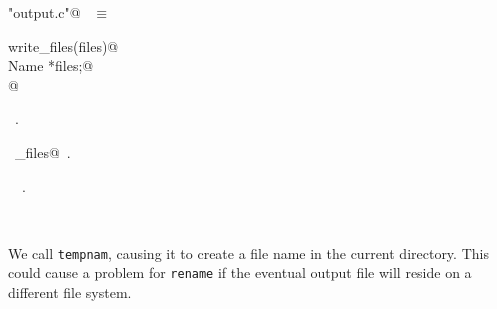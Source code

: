 \documentclass{report}
\begin{document}
\begin{flushleft} \small
\begin{minipage}{\linewidth} \label{scrap129}
\verb@"output.c"@\nobreak\ {\footnotesize {} }$\equiv$
\vspace{-1ex}
\begin{list}{}{} \item
\mbox{}\verb@void write_files(files)@\\
\mbox{}\verb@     Name *files;@\\
\mbox{}@\\
\mbox{}\verb@@{\NWsep}
\end{list}
\vspace{-1ex}
\footnotesize\addtolength{\baselineskip}{-1ex}
\begin{list}{}{\setlength{\itemsep}{-\parsep}\setlength{\itemindent}{-\leftmargin}}
\item \NWtxtFileDefBy\ .
\end{list}
\vspace{-2ex}
\footnotesize\addtolength{\baselineskip}{-1ex}
\begin{list}{}{\setlength{\itemsep}{-\parsep}\setlength{\itemindent}{-\leftmargin}}
\item \NWtxtIdentsDefed\nobreak\  \verb@write_files@\nobreak\ .\end{list}
\vspace{-2ex}
\footnotesize\addtolength{\baselineskip}{-1ex}
\begin{list}{}{\setlength{\itemsep}{-\parsep}\setlength{\itemindent}{-\leftmargin}}
\item \NWtxtIdentsUsed\nobreak\  \verb@Name@\nobreak\ .\end{list}
\end{minipage}\\[4ex]
\end{flushleft}
We call \verb|tempnam|, causing it to create a file name in the
current directory.  This could cause a problem for \verb|rename| if
the eventual output file will reside on a different file system.
\end{document}
